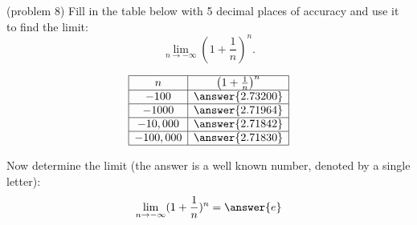\documentclass[handout]{ximera}
\begin{document}
\begin{problem}(problem 8)
Fill in the table below with 5 decimal places of accuracy and use it to find the limit:
\[\lim_{n \to -\infty} \left(1+\frac{1}{n}\right)^n.\]


\[
\begin{array}{| c | c|}
	\hline
  n & \left(1+\frac{1}{n}\right)^n\\
  \hline
  -100 & \answer{2.73200}   \\ 
	\hline 
	-1000 & \answer{2.71964} \\
	\hline
	-10,000 & \answer{2.71842}	\\
	\hline
	-100,000 & \answer{2.71830}\\
	\hline
\end{array}
\]

Now determine the limit (the answer is a well known number, denoted by a single letter):
\[
\lim_{n \to -\infty} (1+\frac{1}{n})^n = \answer{e}
\]
\end{problem}




\begin{center}
\begin{foldable}
\end{foldable}
\end{center}
\end{document}
